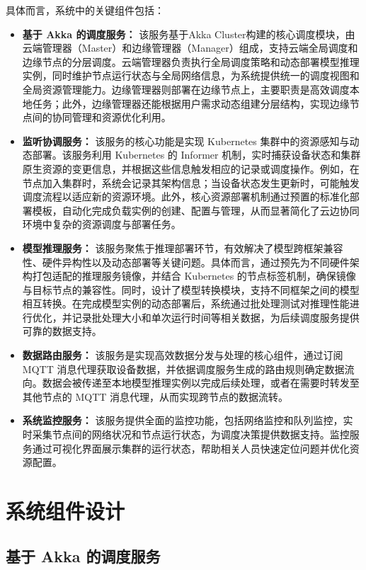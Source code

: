 具体而言，系统中的关键组件包括：

\begin{itemize}
    \item \textbf{基于 Akka 的调度服务：} 该服务基于Akka Cluster构建的核心调度模块，由云端管理器（Master）和边缘管理器（Manager）组成，支持云端全局调度和边缘节点的分层调度。云端管理器负责执行全局调度策略和动态部署模型推理实例，同时维护节点运行状态与全局网络信息，为系统提供统一的调度视图和全局资源管理能力。边缘管理器则部署在边缘节点上，主要职责是高效调度本地任务；此外，边缘管理器还能根据用户需求动态组建分层结构，实现边缘节点间的协同管理和资源优化利用。
    \item \textbf{监听协调服务：} 该服务的核心功能是实现 Kubernetes 集群中的资源感知与动态部署。该服务利用 Kubernetes 的 Informer 机制，实时捕获设备状态和集群原生资源的变更信息，并根据这些信息触发相应的记录或调度操作。例如，在节点加入集群时，系统会记录其架构信息；当设备状态发生更新时，可能触发调度流程以适应新的资源环境。此外，核心资源部署机制通过预置的标准化部署模板，自动化完成负载实例的创建、配置与管理，从而显著简化了云边协同环境中复杂的资源调度与部署任务。
    \item \textbf{模型推理服务：} 该服务聚焦于推理部署环节，有效解决了模型跨框架兼容性、硬件异构性以及动态部署等关键问题。具体而言，通过预先为不同硬件架构打包适配的推理服务镜像，并结合 Kubernetes 的节点标签机制，确保镜像与目标节点的兼容性。同时，设计了模型转换模块，支持不同框架之间的模型相互转换。在完成模型实例的动态部署后，系统通过批处理测试对推理性能进行优化，并记录批处理大小和单次运行时间等相关数据，为后续调度服务提供可靠的数据支持。
    \item \textbf{数据路由服务：} 该服务是实现高效数据分发与处理的核心组件，通过订阅 MQTT 消息代理获取设备数据，并依据调度服务生成的路由规则确定数据流向。数据会被传递至本地模型推理实例以完成后续处理，或者在需要时转发至其他节点的 MQTT 消息代理，从而实现跨节点的数据流转。
    \item \textbf{系统监控服务：} 该服务提供全面的监控功能，包括网络监控和队列监控，实时采集节点间的网络状况和节点运行状态，为调度决策提供数据支持。监控服务通过可视化界面展示集群的运行状态，帮助相关人员快速定位问题并优化资源配置。
\end{itemize}

\section{系统组件设计}

\subsection{基于 Akka 的调度服务}

